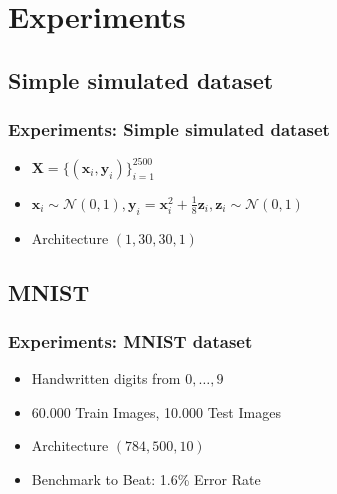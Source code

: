 


\beamertemplatenavigationsymbolsempty{}


\section{Experiments}   
\subsection{Simple simulated dataset}
\begin{frame}
\frametitle{Experiments: Simple simulated dataset}
\begin{itemize}
	\item[] $\mathbf{X}=\{(\mathbf{x}_i,\mathbf{y}_i)\}_{i=1}^{2500}$
	\item[] $\mathbf{x}_i\sim\mathcal{N}(0,1), \mathbf{y}_i= \mathbf{x}_i^2+\frac{1}{8}\mathbf{z}_i, \mathbf{z}_i\sim\mathcal{N}(0,1)$
	\item[] Architecture $(1,30,30,1)$
\end{itemize}
\end{frame}
\subsection{MNIST}
\begin{frame}
\frametitle{Experiments: MNIST dataset}
\begin{itemize}
	\item[] Handwritten digits from $0,\ldots,9$
	\item[] 60.000 Train Images, 10.000 Test Images 
	\item[] Architecture $(784,500,10)$
	\item[] Benchmark to Beat: 1.6\% Error Rate
\end{itemize}
\end{frame}
